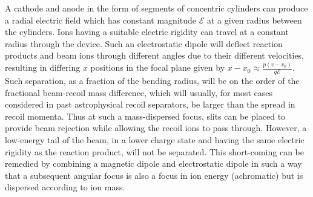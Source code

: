 A cathode and anode in the form of segments of concentric cylinders can produce a radial electric field which has constant magnitude $\mathcal{E}$  at a given radius between the cylinders.   Ions having a suitable electric rigidity can travel at a constant radius through the device. Such an electrostatic dipole will deflect reaction products and beam ions through different angles due to their different velocities, resulting in differing $x$ positions in the focal plane given by $x-x_0\approx\frac{p(v-v_0)}{q\mathcal{E}}$. Such separation, as a fraction of the bending radius, will be on the order of the fractional beam-recoil mass difference, which will usually, for most cases considered in past astrophysical recoil separators, be larger than the spread in recoil momenta. Thus at such a mass-dispersed focus, slits can be placed to provide beam rejection while allowing the recoil ions to pass through.   However, a low-energy tail of the beam, in a lower charge state and having the same electric rigidity as the reaction product, will not be separated. This short-coming can be remedied by combining a magnetic dipole and electrostatic dipole in such a way that a subsequent angular focus is also a focus in ion energy (achromatic) but is dispersed according to ion mass.  

